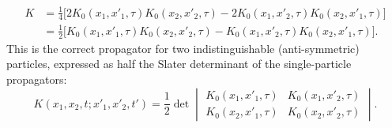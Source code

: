 \begin{align}
  K &= \frac{1}{4} \bigg[ 2 K_0(x_1, x'_1, \tau) K_0(x_2, x'_2, \tau)
  - 2 K_0(x_1, x'_2, \tau) K_0(x_2, x'_1, \tau) \bigg] \nonumber \\
    &= \frac{1}{2} \bigg[ K_0(x_1, x'_1, \tau) K_0(x_2, x'_2, \tau)
    - K_0(x_1, x'_2, \tau) K_0(x_2, x'_1, \tau) \bigg].
  \end{align}
  This is the correct propagator for two indistinguishable (anti-symmetric)
  particles, expressed as half the Slater determinant of the
  single-particle propagators:
  \begin{equation} \label{eq:propagator_slater_det}
    K(x_1, x_2, t; x'_1, x'_2, t') = \frac{1}{2} \det
    \begin{vmatrix}
      K_0(x_1, x'_1, \tau) & K_0(x_1, x'_2, \tau) \\
      K_0(x_2, x'_1, \tau) & K_0(x_2, x'_2, \tau)
    \end{vmatrix}.
  \end{equation}

